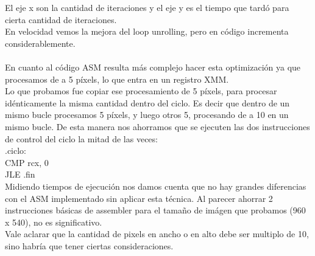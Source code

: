 El eje x son la cantidad de iteraciones y el eje y es el tiempo que tard\'o para cierta cantidad de iteraciones.\\
En velocidad vemos la mejora del loop unrolling, pero en c\'odigo incrementa considerablemente.\\\\

En cuanto al c\'odigo ASM resulta m\'as complejo hacer esta optimizaci\'on ya que procesamos de a 5 p\'ixels, lo que entra en un registro XMM.\\
Lo que probamos fue copiar ese procesamiento de 5 p\'ixels, para procesar id\'enticamente la misma cantidad dentro del ciclo. Es decir que dentro de un mismo bucle procesamos 5 p\'ixels, y luego otros 5, procesando de a 10 en un mismo bucle. De esta manera nos ahorramos que se ejecuten las dos instrucciones de control del ciclo la mitad de las veces:\\

.ciclo:\\
CMP rcx, 0\\
JLE .fin\\

Midiendo tiempos de ejecuci\'on nos damos cuenta que no hay grandes diferencias con el ASM implementado sin aplicar esta t\'ecnica. Al parecer ahorrar 2 instrucciones b\'asicas de assembler para el tamaño de im\'agen que probamos (960 x 540), no es significativo.\\
Vale aclarar que la cantidad de pixels en ancho o en alto debe ser multiplo de 10, sino habr\'ia que tener ciertas consideraciones.


